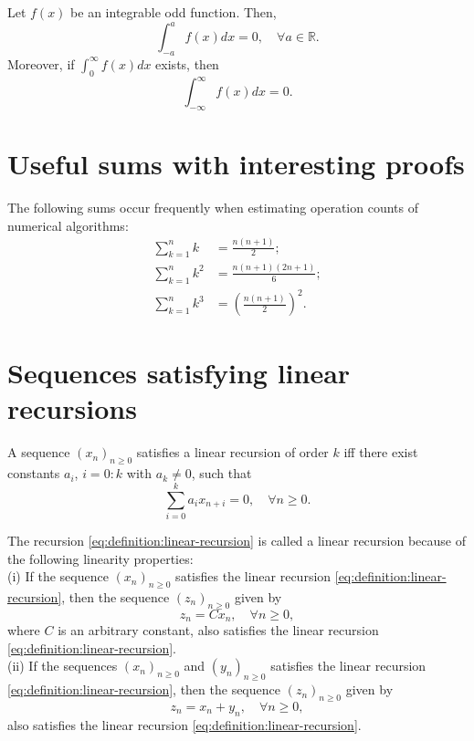 \begin{lemma}
    Let \(f(x)\) be an integrable odd function. Then,
    \begin{equation}
        \int_{-a}^{a} f(x) dx = 0, \quad \forall a \in \mathbb{R}.
    \end{equation}
    Moreover, if \(\int_{0}^{\infty} f(x) dx\) exists, then
    \begin{equation}
        \int_{-\infty}^{\infty} f(x) dx = 0.
    \end{equation}
\end{lemma}

\section{Useful sums with interesting proofs}

The following sums occur frequently when estimating operation counts of numerical algorithms:
\begin{align}
    \sum_{k=1}^{n} k &= \frac{n (n + 1)}{2}; \label{eq:sum-pow1}\\
    \sum_{k=1}^{n} k^2 &= \frac{n (n + 1) (2 n + 1)}{6}; \label{eq:sum-pow2}\\
    \sum_{k=1}^{n} k^3 &= \left( \frac{n (n + 1)}{2} \right)^2. \label{eq:sum-pow3}
\end{align}

\section{Sequences satisfying linear recursions}

\begin{definition}
    A sequence \((x_n)_{n \geq 0}\) satisfies a linear recursion of order \(k\) iff there exist constants \(a_i\), \(i = 0 : k\) with \(a_k \neq 0\), such that
    \begin{equation}
        \sum_{i=0}^{k} a_i x_{n+i} = 0, \quad \forall n \geq 0.
        \label{eq:definition:linear-recursion}
    \end{equation}
\end{definition}

The recursion \eqref{eq:definition:linear-recursion} is called a linear recursion because of the following linearity properties:\\
(i) If the sequence \((x_n)_{n \geq 0}\) satisfies the linear recursion \eqref{eq:definition:linear-recursion}, then the sequence \((z_n)_{n \geq 0}\) given by
\begin{equation}
    z_n = C x_n, \quad \forall n \geq 0,
\end{equation}
where \(C\) is an arbitrary constant, also satisfies the linear recursion \eqref{eq:definition:linear-recursion}.\\
(ii) If the sequences \((x_n)_{n \geq 0}\) and \((y_n)_{n \geq 0}\) satisfies the linear recursion \eqref{eq:definition:linear-recursion}, then the sequence \((z_n)_{n \geq 0}\) given by
\begin{equation}
    z_n = x_n + y_n, \quad \forall n \geq 0,
\end{equation}
also satisfies the linear recursion \eqref{eq:definition:linear-recursion}.

